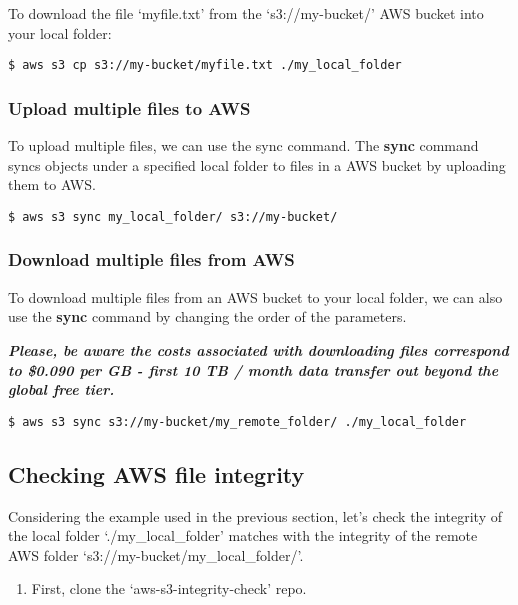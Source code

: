 \documentclass[]{book}
\providecommand{\tightlist}{%
  \setlength{\itemsep}{0pt}\setlength{\parskip}{0pt}}
\begin{document}
To download the file `myfile.txt' from the `s3://my-bucket/' AWS bucket
into your local folder:

\begin{verbatim}
$ aws s3 cp s3://my-bucket/myfile.txt ./my_local_folder 
\end{verbatim}

\subsubsection{Upload multiple files to
AWS}\label{upload-multiple-files-to-aws}

To upload multiple files, we can use the sync command. The \textbf{sync}
command syncs objects under a specified local folder to files in a AWS
bucket by uploading them to AWS.

\begin{verbatim}
$ aws s3 sync my_local_folder/ s3://my-bucket/ 
\end{verbatim}

\subsubsection{Download multiple files from
AWS}\label{download-multiple-files-from-aws}

To download multiple files from an AWS bucket to your local folder, we
can also use the \textbf{sync} command by changing the order of the
parameters.

\textbf{\emph{Please, be aware the costs associated with downloading
files correspond to \$0.090 per GB - first 10 TB / month data transfer
out beyond the global free tier.}}

\begin{verbatim}
$ aws s3 sync s3://my-bucket/my_remote_folder/ ./my_local_folder 
\end{verbatim}

\subsection{Checking AWS file
integrity}\label{checking-aws-file-integrity}

Considering the example used in the previous section, let's check the
integrity of the local folder `./my\_local\_folder' matches with the
integrity of the remote AWS folder `s3://my-bucket/my\_local\_folder/'.

\begin{enumerate}
\def\labelenumi{\arabic{enumi}.}
\tightlist
\item
  First, clone the `aws-s3-integrity-check' repo.
\end{enumerate}
\end{document}
